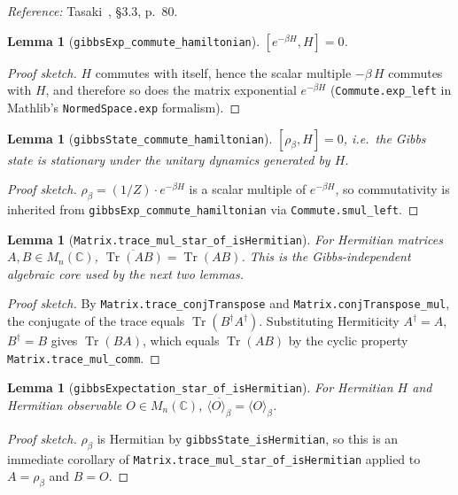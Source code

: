 \documentclass[a4paper,11pt]{article}
\newtheorem{lemma}[theorem]{Lemma}
\begin{document}
\emph{Reference:} Tasaki~\cite{Tasaki:QMB}, §3.3, p.~80.

\begin{lemma}[\texttt{gibbsExp\_commute\_hamiltonian}]
$[e^{-\beta H}, H] = 0$.
\end{lemma}

\begin{proof}[Proof sketch]
$H$ commutes with itself, hence the scalar multiple $-\beta\,H$ commutes
with $H$, and therefore so does the matrix exponential $e^{-\beta H}$
(\texttt{Commute.exp\_left} in Mathlib's
\texttt{NormedSpace.exp} formalism).
\end{proof}

\begin{lemma}[\texttt{gibbsState\_commute\_hamiltonian}]
$[\rho_\beta, H] = 0$, i.e.\ the Gibbs state is stationary under the
unitary dynamics generated by $H$.
\end{lemma}

\begin{proof}[Proof sketch]
$\rho_\beta = (1/Z) \cdot e^{-\beta H}$ is a scalar multiple of
$e^{-\beta H}$, so commutativity is inherited from
\texttt{gibbsExp\_commute\_hamiltonian} via \texttt{Commute.smul\_left}.
\end{proof}

\begin{lemma}[\texttt{Matrix.trace\_mul\_star\_of\_isHermitian}]
For Hermitian matrices $A, B \in M_n(\mathbb{C})$,
$\overline{\operatorname{Tr}(A B)} = \operatorname{Tr}(A B)$.
This is the Gibbs-independent algebraic core used by the next two
lemmas.
\end{lemma}

\begin{proof}[Proof sketch]
By \texttt{Matrix.trace\_conjTranspose} and
\texttt{Matrix.conjTranspose\_mul}, the conjugate of the trace equals
$\operatorname{Tr}(B^\dagger A^\dagger)$. Substituting Hermiticity
$A^\dagger = A$, $B^\dagger = B$ gives $\operatorname{Tr}(B A)$, which
equals $\operatorname{Tr}(A B)$ by the cyclic property
\texttt{Matrix.trace\_mul\_comm}.
\end{proof}

\begin{lemma}[\texttt{gibbsExpectation\_star\_of\_isHermitian}]
For Hermitian $H$ and Hermitian observable $O \in M_n(\mathbb{C})$,
$\overline{\langle O \rangle_\beta} = \langle O \rangle_\beta$.
\end{lemma}

\begin{proof}[Proof sketch]
$\rho_\beta$ is Hermitian by \texttt{gibbsState\_isHermitian}, so this
is an immediate corollary of
\texttt{Matrix.trace\_mul\_star\_of\_isHermitian} applied to
$A = \rho_\beta$ and $B = O$.
\end{proof}
\end{document}
